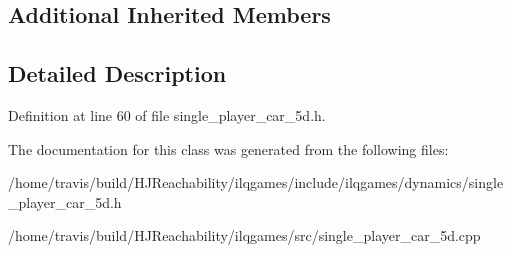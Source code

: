 \subsection*{Additional Inherited Members}


\subsection{Detailed Description}


Definition at line 60 of file single\+\_\+player\+\_\+car\+\_\+5d.\+h.



The documentation for this class was generated from the following files\+:\begin{DoxyCompactItemize}
\item 
/home/travis/build/\+H\+J\+Reachability/ilqgames/include/ilqgames/dynamics/single\+\_\+player\+\_\+car\+\_\+5d.\+h\item 
/home/travis/build/\+H\+J\+Reachability/ilqgames/src/single\+\_\+player\+\_\+car\+\_\+5d.\+cpp\end{DoxyCompactItemize}
